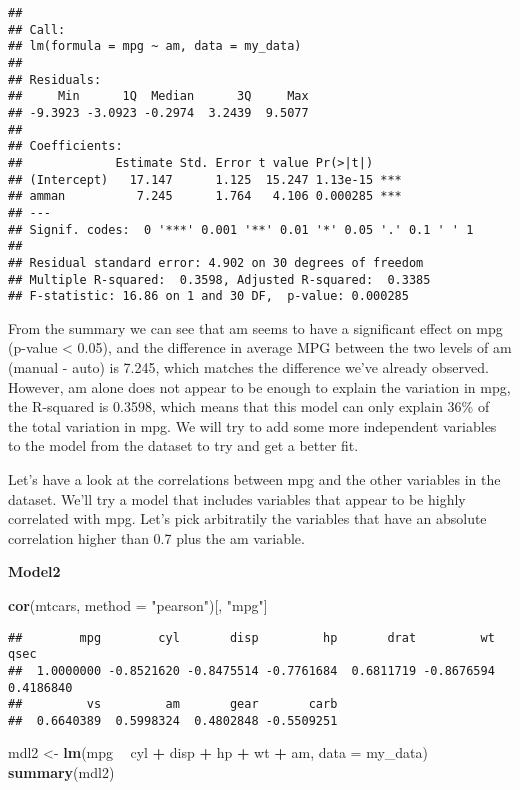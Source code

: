 \documentclass[
]{article}
\newenvironment{Shaded}{\begin{snugshade}}{\end{snugshade}}
\newcommand{\DataTypeTok}[1]{\textcolor[rgb]{0.13,0.29,0.53}{#1}}
\newcommand{\KeywordTok}[1]{\textcolor[rgb]{0.13,0.29,0.53}{\textbf{#1}}}
\newcommand{\NormalTok}[1]{#1}
\newcommand{\OperatorTok}[1]{\textcolor[rgb]{0.81,0.36,0.00}{\textbf{#1}}}
\newcommand{\StringTok}[1]{\textcolor[rgb]{0.31,0.60,0.02}{#1}}
\begin{document}
\begin{verbatim}
## 
## Call:
## lm(formula = mpg ~ am, data = my_data)
## 
## Residuals:
##     Min      1Q  Median      3Q     Max 
## -9.3923 -3.0923 -0.2974  3.2439  9.5077 
## 
## Coefficients:
##             Estimate Std. Error t value Pr(>|t|)    
## (Intercept)   17.147      1.125  15.247 1.13e-15 ***
## amman          7.245      1.764   4.106 0.000285 ***
## ---
## Signif. codes:  0 '***' 0.001 '**' 0.01 '*' 0.05 '.' 0.1 ' ' 1
## 
## Residual standard error: 4.902 on 30 degrees of freedom
## Multiple R-squared:  0.3598, Adjusted R-squared:  0.3385 
## F-statistic: 16.86 on 1 and 30 DF,  p-value: 0.000285
\end{verbatim}

From the summary we can see that am seems to have a significant effect
on mpg (p-value \textless{} 0.05), and the difference in average MPG
between the two levels of am (manual - auto) is 7.245, which matches the
difference we've already observed. However, am alone does not appear to
be enough to explain the variation in mpg, the R-squared is 0.3598,
which means that this model can only explain 36\% of the total variation
in mpg. We will try to add some more independent variables to the model
from the dataset to try and get a better fit.

Let's have a look at the correlations between mpg and the other
variables in the dataset. We'll try a model that includes variables that
appear to be highly correlated with mpg. Let's pick arbitratily the
variables that have an absolute correlation higher than 0.7 plus the am
variable.

\textbf{Model2}

\begin{Shaded}
\begin{Highlighting}[]
\KeywordTok{cor}\NormalTok{(mtcars, }\DataTypeTok{method =} \StringTok{"pearson"}\NormalTok{)[, }\StringTok{"mpg"}\NormalTok{]}
\end{Highlighting}
\end{Shaded}

\begin{verbatim}
##        mpg        cyl       disp         hp       drat         wt       qsec 
##  1.0000000 -0.8521620 -0.8475514 -0.7761684  0.6811719 -0.8676594  0.4186840 
##         vs         am       gear       carb 
##  0.6640389  0.5998324  0.4802848 -0.5509251
\end{verbatim}

\begin{Shaded}
\begin{Highlighting}[]
\NormalTok{mdl2 <-}\StringTok{ }\KeywordTok{lm}\NormalTok{(mpg }\OperatorTok{~}\StringTok{ }\NormalTok{cyl }\OperatorTok{+}\StringTok{ }\NormalTok{disp }\OperatorTok{+}\StringTok{ }\NormalTok{hp }\OperatorTok{+}\StringTok{ }\NormalTok{wt }\OperatorTok{+}\StringTok{ }\NormalTok{am, }\DataTypeTok{data =}\NormalTok{ my_data)}
\KeywordTok{summary}\NormalTok{(mdl2)}
\end{Highlighting}
\end{Shaded}
\end{document}
